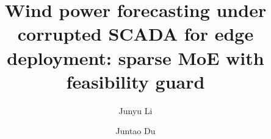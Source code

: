 \documentclass[review,1p,times]{elsarticle}
\newif\ifincludefrontmatterextras
\newenvironment{highlights}{\par\noindent\textbf{Highlights}\par\begin{itemize}\itemsep0pt}{\end{itemize}\par}%
\begin{document}
\begin{frontmatter}

\title{Wind power forecasting under corrupted SCADA for edge deployment: sparse MoE with feasibility guard}

\author[1]{Junyu Li}

\author[1]{Juntao Du}



\ifincludefrontmatterextras
\begin{highlights}
\item Sparse MoE preserves positive skill under severe SCADA corruption.
\item Feasibility guards prevent non-physical outputs during sensor failures.
\item Edge screening should use joint robustness-safety-deployability criteria.
\item Dispatch paradox: lower DA curtailment can coexist with higher RT balancing.
\item Model screening should couple robustness stress with grid-constrained value.
\end{highlights}
\fi


\end{frontmatter}
\end{document}
